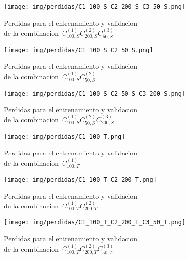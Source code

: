 \begin{figure}[H]
    \centerline{\texttt{[image: img/perdidas/C1\_100\_S\_C2\_200\_S\_C3\_50\_S.png]}}
    \caption{Perdidas para el entrenamiento y validacion\\ de la combinacion~$C^{(1)}_{100,S}C^{(2)}_{200,S}C^{(3)}_{50,S}$}
    \label{fig:C1_100_S_C2_200_S_C3_50_S}
\end{figure}

\begin{figure}[H]
    \centerline{\texttt{[image: img/perdidas/C1\_100\_S\_C2\_50\_S.png]}}
    \caption{Perdidas para el entrenamiento y validacion\\ de la combinacion~$C^{(1)}_{100,S}C^{(2)}_{50,S}$}
    \label{fig:C1_100_S_C2_50_S}
\end{figure}

\begin{figure}[H]
    \centerline{\texttt{[image: img/perdidas/C1\_100\_S\_C2\_50\_S\_C3\_200\_S.png]}}
    \caption{Perdidas para el entrenamiento y validacion\\ de la combinacion~$C^{(1)}_{100,S}C^{(2)}_{50,S}C^{(3)}_{200,S}$}
    \label{fig:C1_100_S_C2_50_S_C3_200_S}
\end{figure}

\begin{figure}[H]
    \centerline{\texttt{[image: img/perdidas/C1\_100\_T.png]}}
    \caption{Perdidas para el entrenamiento y validacion\\ de la combinacion~$C^{(1)}_{100,T}$}
    \label{fig:C1_100_T}
\end{figure}

\begin{figure}[H]
    \centerline{\texttt{[image: img/perdidas/C1\_100\_T\_C2\_200\_T.png]}}
    \caption{Perdidas para el entrenamiento y validacion\\ de la combinacion~$C^{(1)}_{100,T}C^{(2)}_{200,T}$}
    \label{fig:C1_100_T_C2_200_T}
\end{figure}

\begin{figure}[H]
    \centerline{\texttt{[image: img/perdidas/C1\_100\_T\_C2\_200\_T\_C3\_50\_T.png]}}
    \caption{Perdidas para el entrenamiento y validacion\\ de la combinacion~$C^{(1)}_{100,T}C^{(2)}_{200,T}C^{(3)}_{50,T}$}
    \label{fig:C1_100_T_C2_200_T_C3_50_T}
\end{figure}

